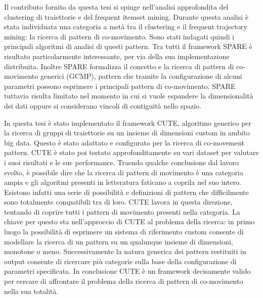 Il contributo fornito da questa tesi si spinge nell'analisi approfondita del clustering di traiettorie e del frequent itemset mining.
Durante questa analisi è stata individuata una categoria a metà tra il clustering e il frequent trajectory mining: la ricerca di pattern di co-movimento.
Sono stati indagati quindi i principali algoritmi di analisi di questi pattern.
Tra tutti il framework SPARE è risultato particolarmente interessante, per via della sua implementazione distribuita.
Inoltre SPARE formalizza il concetto e la ricerca di pattern di co-movimento generici (GCMP), pattern che tramite la configurazione di alcuni parametri possono esprimere i principali pattern di co-movimento.
SPARE tuttavia risulta limitato nel momento in cui si vuole espandere la dimensionalità dei dati oppure si considerano vincoli di contiguità nello spazio.

In questa tesi è stato implementato il framework CUTE, algoritmo generico per la ricerca di gruppi di traiettorie su un insieme di dimensioni custom in ambito big data.
Questo è stato adattato e configurato per la ricerca di co-movement pattern.
CUTE è stato poi testato approfonditamente su vari dataset per valutare i suoi risultati e le sue performance.
Traendo qualche conclusione dal lavoro svolto, è possibile dire che la ricerca di pattern di movimento è una categoria ampia e gli algoritmi presenti in letteratura faticano a coprila nel suo intero.
Esistono infatti una serie di possibilità e definizioni di pattern che difficilmente sono totalmente compatibili tra di loro.
CUTE lavora in questa direzione, tentando di coprire tutti i pattern di movimento presenti nella categoria.
La chiave per questo sta nell'approccio di CUTE al problema della ricerca: in primo luogo la possibilità di esprimere un sistema di riferimento custom consente di modellare la ricerca di un pattern su un qualunque insieme di dimensioni, monotone o meno.
Successivamente la natura generica dei pattern restituiti in output consente di ricercare più categorie sulla base della configurazione di parametri specificata.
In conclusione CUTE è un framework decisamente valido per cercare di affrontare il problema della ricerca di pattern di co-movimento nella sua totalità.

